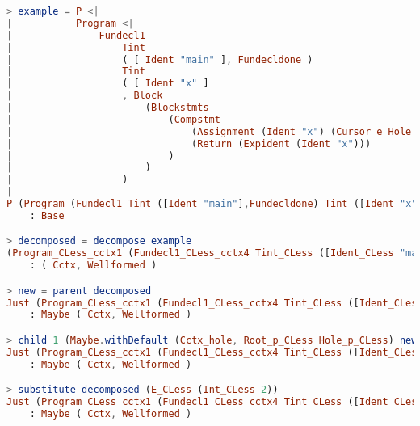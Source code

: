 \begin{lstlisting}[style=inline, language=elm, caption={Elm REPL demonstration of C language editor}, label={lst:c-repl}]
> example = P <|
|           Program <|
|               Fundecl1
|                   Tint
|                   ( [ Ident "main" ], Fundecldone )
|                   Tint
|                   ( [ Ident "x" ]
|                   , Block
|                       (Blockstmts
|                           (Compstmt
|                               (Assignment (Ident "x") (Cursor_e Hole_e))
|                               (Return (Expident (Ident "x")))
|                           )
|                       )
|                   )
|
P (Program (Fundecl1 Tint ([Ident "main"],Fundecldone) Tint ([Ident "x"],Block (Blockstmts (Compstmt (Assignment (Ident "x") (Cursor_e Hole_e)) (Return (Expident (Ident "x"))))))))
    : Base

> decomposed = decompose example
(Program_CLess_cctx1 (Fundecl1_CLess_cctx4 Tint_CLess ([Ident_CLess "main"],Fundecldone_CLess) Tint_CLess ([Ident_CLess "x"],Block_CLess_cctx1 (Blockstmts_CLess_cctx1 (Compstmt_CLess_cctx1 (Assignment_CLess_cctx2 (Ident_CLess "x") Cctx_hole) (Return_CLess (Expident_CLess (Ident_CLess "x"))))))),Root_e_CLess Hole_e_CLess)
    : ( Cctx, Wellformed )

> new = parent decomposed
Just (Program_CLess_cctx1 (Fundecl1_CLess_cctx4 Tint_CLess ([Ident_CLess "main"],Fundecldone_CLess) Tint_CLess ([Ident_CLess "x"],Block_CLess_cctx1 (Blockstmts_CLess_cctx1 (Compstmt_CLess_cctx1 Cctx_hole (Return_CLess (Expident_CLess (Ident_CLess "x"))))))),Root_s_CLess (Assignment_CLess (Ident_CLess "x") Hole_e_CLess))
    : Maybe ( Cctx, Wellformed )

> child 1 (Maybe.withDefault (Cctx_hole, Root_p_CLess Hole_p_CLess) new)
Just (Program_CLess_cctx1 (Fundecl1_CLess_cctx4 Tint_CLess ([Ident_CLess "main"],Fundecldone_CLess) Tint_CLess ([Ident_CLess "x"],Block_CLess_cctx1 (Blockstmts_CLess_cctx1 (Compstmt_CLess_cctx1 (Assignment_CLess_cctx1 Cctx_hole Hole_e_CLess) (Return_CLess (Expident_CLess (Ident_CLess "x"))))))),Root_id_CLess (Ident_CLess "x"))
    : Maybe ( Cctx, Wellformed )

> substitute decomposed (E_CLess (Int_CLess 2))
Just (Program_CLess_cctx1 (Fundecl1_CLess_cctx4 Tint_CLess ([Ident_CLess "main"],Fundecldone_CLess) Tint_CLess ([Ident_CLess "x"],Block_CLess_cctx1 (Blockstmts_CLess_cctx1 (Compstmt_CLess_cctx1 (Assignment_CLess_cctx2 (Ident_CLess "x") Cctx_hole) (Return_CLess (Expident_CLess (Ident_CLess "x"))))))),Root_e_CLess (Int_CLess 2))
    : Maybe ( Cctx, Wellformed )
\end{lstlisting}


